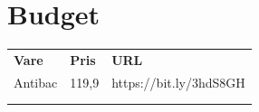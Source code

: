 \documentclass{article}
\begin{document}
\section{Budget}
\begin{table}[]
\begin{tabular}{lll}
\textbf{Vare} & \textbf{Pris} & \textbf{URL}      \\
Antibac       & 119,9         & https://bit.ly/3hdS8GH \\
              &               &                   \\
              &               &                  
\end{tabular}
\end{table}
\end{document}
